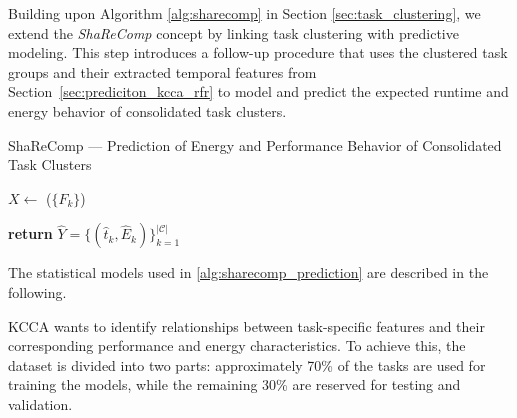 Building upon Algorithm \ref{alg:sharecomp} in Section \ref{sec:task_clustering}, we extend the \textit{ShaReComp} concept by linking task clustering with predictive modeling. This step introduces a follow-up procedure that uses the clustered task groups and their extracted temporal features from Section~\ref{sec:prediciton_kcca_rfr} to model and predict the expected runtime and energy behavior of consolidated task clusters.

\begin{algorithm}[H]
    \caption{ShaReComp — Prediction of Energy and Performance Behavior of Consolidated Task Clusters}
    \label{alg:sharecomp_prediction}


    \BlankLine
    $X \gets$ \Build($\{F_k\}$) 

    \BlankLine
    \BlankLine
    \textbf{return } $\hat{Y} = \{ (\hat{t}_k, \hat{E}_k) \}_{k=1}^{|\mathcal{C}|}$
\end{algorithm}

The statistical models used in \ref{alg:sharecomp_prediction} are described in the following.

\label{sec:KCCA}
KCCA wants to identify relationships between task-specific features and their corresponding performance and energy characteristics. To achieve this, the dataset is divided into two parts: approximately 70\% of the tasks are used for training the models, while the remaining 30\% are reserved for testing and validation.

